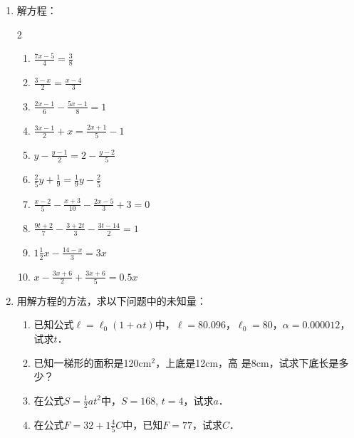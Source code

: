 \begin{enumerate}
\item 解方程：
\begin{multicols}{2}
\begin{enumerate}
\item $\frac{7x-5}{4}=\frac{3}{8}$
\item $\frac{3-x}{2}=\frac{x-4}{3}$
\item $\frac{2x-1}{6}-\frac{5x-1}{8}=1$
\item $\frac{3x-1}{2}+x=\frac{2x+1}{5}-1$
\item $y-\frac{y-1}{2}=2-\frac{y-2}{5}$
\item $\frac{2}{5}y+\frac{1}{9}=\frac{1}{9}y-\frac{2}{5}$
\item $\frac{x-2}{5}-\frac{x+3}{10}-\frac{2x-5}{3}+3=0$
\item $\frac{9t+2}{7}-\frac{3+2t}{3}-\frac{3t-14}{2}=1$
\item $1\frac{1}{2}x-\frac{14-x}{3}=3x$
\item $x-\frac{3x+6}{2}+\frac{3x+6}{5}=0.5x$    
\end{enumerate}
\end{multicols}
\item 用解方程的方法，求以下问题中的未知量：
\begin{enumerate}
    \item 已知公式$\ell=\ell_0(1+\alpha t)$中，$\ell= 80.096$，$\ell_0 = 80$，$\alpha=0.000012$，试求$t$．
\item 已知一梯形的面积是120$\mathrm{cm^2}$，上底是12$\mathrm{cm}$，高
是8$\mathrm{cm}$，试求下底长是多少？
\item 在公式$S=\frac{1}{2}at^2$中，$S=168$, $t=4$，试求$a$．
\item 在公式$F=32+1\frac{4}{5}C$中，已知$F=77$，试求$C$．
\end{enumerate}


\end{enumerate}
